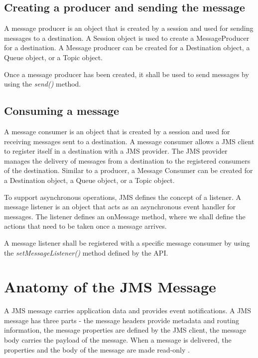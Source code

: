 \documentclass[9pt,twocolumn,twoside]{../../styles/osajnl}
\begin{document}
\subsection{Creating a producer and sending the message}

A message producer is an object that is created by a session and used
for sending messages to a destination.  A Session object is used to
create a MessageProducer for a destination. A Message producer can be
created for a Destination object, a Queue object, or a Topic object.

Once a message producer has been created, it shall be used to send
messages by using the \emph{send()} method.

\subsection{Consuming a message}

A message consumer is an object that is created by a session and used
for receiving messages sent to a destination.  A message consumer
allows a JMS client to register itself in a destination with a JMS
provider. The JMS provider manages the delivery of messages from a
destination to the registered consumers of the destination.  Similar
to a producer, a Message Consumer can be created for a Destination
object, a Queue object, or a Topic object.

To support asynchronous operations, JMS defines the concept of a
listener.  A message listener is an object that acts as an
asynchronous event handler for messages. The listener defines an
onMessage method, where we shall define the actions that need to be
taken once a message arrives.

A message listener shall be registered with a specific message consumer
by using the \emph{setMessageListener()} method defined by the API.

\section{Anatomy of the JMS Message}


A JMS message carries application data and provides event
notifications.  A JMS message has three parts - the message headers
provide metadata and routing information, the message properties are
defined by the JMS client, the message body carries the payload of the
message. When a message is delivered, the properties and the body of
the message are made read-only \cite{www-jms-fischli-article}.
\end{document}
